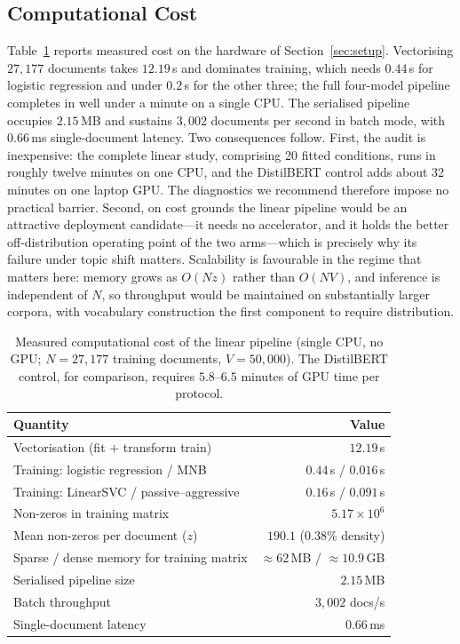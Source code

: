 \documentclass[conference]{IEEEtran}
\begin{document}
\subsection{Computational Cost}
\label{sec:results-cost}
Table~\ref{tab:cost} reports measured cost on the hardware of
Section~\ref{sec:setup}. Vectorising $27{,}177$ documents takes $12.19$\,s and
dominates training, which needs $0.44$\,s for logistic regression and under
$0.2$\,s for the other three; the full four-model pipeline completes in well
under a minute on a single CPU. The serialised pipeline occupies $2.15$\,MB and
sustains $3{,}002$ documents per second in batch mode, with $0.66$\,ms
single-document latency. Two consequences follow. First, the audit is
inexpensive: the complete linear study, comprising 20 fitted conditions, runs in
roughly twelve minutes on one CPU, and the DistilBERT control adds about
32 minutes on one laptop GPU. The diagnostics we recommend therefore impose no
practical barrier. Second, on cost grounds the linear pipeline would be an
attractive deployment candidate---it needs no accelerator, and it holds the
better off-distribution operating point of the two arms---which is precisely why
its failure under topic shift matters.
Scalability is favourable in the regime that matters here: memory grows as
$O(Nz)$ rather than $O(NV)$, and inference is independent of $N$, so
throughput would be maintained on substantially larger corpora, with
vocabulary construction the first component to require distribution.

\begin{table}[t]
\centering
\caption{Measured computational cost of the linear pipeline (single CPU, no
GPU; $N=27{,}177$ training documents, $V=50{,}000$). The DistilBERT control,
for comparison, requires $5.8$--$6.5$ minutes of GPU time per protocol.}
\label{tab:cost}
\footnotesize
\begin{tabular}{@{}lr@{}}
\toprule
Quantity & Value\\
\midrule
Vectorisation (fit $+$ transform train) & $12.19$\,s\\
Training: logistic regression / MNB & $0.44$\,s / $0.016$\,s\\
Training: LinearSVC / passive--aggressive & $0.16$\,s / $0.091$\,s\\
Non-zeros in training matrix & $5.17\times10^{6}$\\
Mean non-zeros per document ($z$) & $190.1$ ($0.38\%$ density)\\
Sparse / dense memory for training matrix & $\approx62$\,MB / $\approx10.9$\,GB\\
Serialised pipeline size & $2.15$\,MB\\
Batch throughput & $3{,}002$ docs/s\\
Single-document latency & $0.66$\,ms\\
\bottomrule
\end{tabular}
\end{table}
\end{document}
